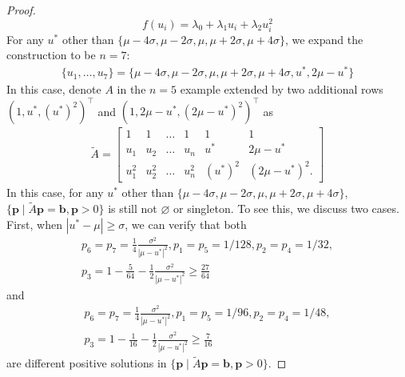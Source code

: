 \documentclass[11pt]{article}
\theoremstyle{referenceplain}
\theoremstyle{referencedefinition}
\theoremstyle{referenceremark}
\begin{document}
\begin{proof}
$$ f(u_i) = \lambda_0 + \lambda_1 u_i + \lambda_2 u_i^2 $$
For any $u^*$ other than $\{\mu-4\sigma,\mu-2\sigma,\mu,\mu+2\sigma,\mu+4\sigma\}$, we expand the construction to be $n=7$:
\begin{align*}
    \{u_1,\dots,u_7\} = \{\mu-4\sigma,\mu-2\sigma,\mu,\mu+2\sigma,\mu+4\sigma,u^*,2\mu-u^*\}
\end{align*}
In this case, denote $A$ in the $n=5$ example extended by two additional rows $(1,u^*,(u^*)^2)^\top$ and $(1,2\mu-u^*,(2\mu-u^*)^2)^\top$ as
\begin{align*}
    \widetilde{A} = \begin{bmatrix}
1 & 1 & \dots & 1 & 1 & 1 \\
u_1 & u_2 & \dots & u_n & u^* & 2\mu-u^* \\
u_1^2 & u_2^2 & \dots & u_n^2 & (u^*)^2 & (2\mu-u^*)^2.
\end{bmatrix}
\end{align*}
In this case, for any $u^*$ other than $\{\mu-4\sigma,\mu-2\sigma,\mu,\mu+2\sigma,\mu+4\sigma\}$, $\{\mathbf{p} \mid \widetilde{A}\mathbf{p}=\mathbf{b}, \mathbf{p} > 0\}$ is still not $\varnothing$ or singleton. To see this, we discuss two cases. First, when $|u^* - \mu|\ge \sigma$, we can verify that both 
\begin{align*}
    p_6=p_7 = \frac{1}{4}\frac{\sigma^2}{|\mu-u^*|^2}, p_1 = p_5 = 1/128, p_2 = p_4 = 1/32,\\ p_3 = 1-\frac{5}{64} - \frac{1}{2}\frac{\sigma^2}{|\mu-u^*|^2}\ge \frac{27}{64}
\end{align*}
and
\begin{align*}
      p_6=p_7 = \frac{1}{4}\frac{\sigma^2}{|\mu-u^*|^2}, p_1 = p_5 = 1/96, p_2 = p_4 = 1/48,\\ p_3 = 1-\frac{1}{16} - \frac{1}{2}\frac{\sigma^2}{|\mu-u^*|^2}\ge \frac{7}{16}
\end{align*}
are different positive solutions in $\{\mathbf{p} \mid \widetilde{A}\mathbf{p}=\mathbf{b}, \mathbf{p} > 0\}$.


\end{proof}
\end{document}
